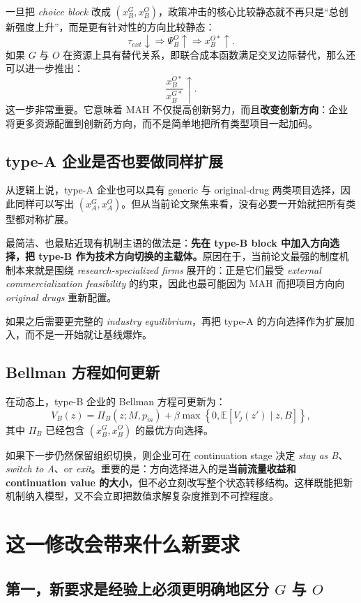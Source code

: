 \documentclass[12pt]{ctexart}
\begin{document}
一旦把 \textit{choice block} 改成 $(x_B^G,x_B^O)$，政策冲击的核心比较静态就不再只是“总创新强度上升”，而是更有针对性的方向比较静态：
\[
\tau_{ext}\downarrow
\Rightarrow
\Psi_B^O\uparrow
\Rightarrow
x_B^{O*}\uparrow.
\]
如果 $G$ 与 $O$ 在资源上具有替代关系，即联合成本函数满足交叉边际替代，那么还可以进一步推出：
\[
\frac{x_B^{O*}}{x_B^{G*}}\uparrow.
\]
这一步非常重要。它意味着 MAH 不仅提高创新努力，而且\textbf{改变创新方向}：企业将更多资源配置到创新药方向，而不是简单地把所有类型项目一起加码。

\subsection{type-A 企业是否也要做同样扩展}

从逻辑上说，type-A 企业也可以具有 generic 与 original-drug 两类项目选择，因此同样可以写出 $(x_A^G,x_A^O)$。但从当前论文聚焦来看，没有必要一开始就把所有类型都对称扩展。

最简洁、也最贴近现有机制主语的做法是：\textbf{先在 type-B block 中加入方向选择，把 type-B 作为技术方向切换的主载体。}原因在于，当前论文最强的制度机制本来就是围绕 \textit{research-specialized firms} 展开的：正是它们最受 \textit{external commercialization feasibility} 的约束，因此也最可能因为 MAH 而把项目方向向 \textit{original drugs} 重新配置。

如果之后需要更完整的 \textit{industry equilibrium}，再把 type-A 的方向选择作为扩展加入，而不是一开始就让基线爆炸。

\subsection{Bellman 方程如何更新}

在动态上，type-B 企业的 Bellman 方程可更新为：
\[
V_B(z)
=
\Pi_B(z;M,p_m)
+
\beta \max\left\{0,\mathbb{E}[V_j(z')\mid z,B]\right\},
\]
其中 $\Pi_B$ 已经包含 $(x_B^G,x_B^O)$ 的最优方向选择。

如果下一步仍然保留组织切换，则企业可在 continuation stage 决定 \textit{stay as B}、\textit{switch to A}、or \textit{exit}。重要的是：方向选择进入的是\textbf{当前流量收益和 continuation value 的大小}，但不必立刻改写整个状态转移结构。这样既能把新机制纳入模型，又不会立即把数值求解复杂度推到不可控程度。

\section{这一修改会带来什么新要求}

\subsection{第一，新要求是经验上必须更明确地区分 $G$ 与 $O$}
\end{document}
